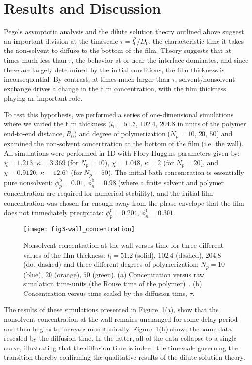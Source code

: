\documentclass[journal=mamobx, layout=twocolumn]{achemso}
\newcommand{\txtf}{\mathrm{f}}
\newcommand{\txtb}{\mathrm{b}}
\begin{document}
\section{Results and Discussion}
Pego's asymptotic analysis and the dilute solution theory outlined above suggest an important division at the timescale $\tau = l_{\txtf}^{2}/D_{0}$, the characteristic time it takes the non-solvent to diffuse to the bottom of the film.
Theory suggests that at times much less than $\tau$, the behavior at or near the interface dominates, and since these are largely determined by the initial conditions, the film thickness is inconsequential.
By contrast, at times much larger than $\tau$, solvent/nonsolvent exchange drives a change in the film concentration, with the film thickness playing an important role.

To test this hypothesis, we performed a series of one-dimensional simulations where we varied the film thickness ($l_{\txtf} = 51.2$, $102.4$, $204.8$ in units of the polymer end-to-end distance, $R_{0}$) and degree of polymerization ($N_{p}=10$, $20$, $50$) and examined the non-solvent concentration at the bottom of the film (i.e. the wall).
All simulations were performed in 1D with Flory-Huggins parameters given by: $\chi = 1.213$, $\kappa = 3.369$ (for $N_{p}=10$), $\chi = 1.048$, $\kappa = 2$ (for $N_{p}=20$), and $\chi = 0.9120$, $\kappa = 12.67$ (for $N_{p}=50$).
The initial bath concentration is essentially pure nonsolvent: $\phi_{p}^{\txtb} = 0.01$, $\phi_{n}^{\txtb} = 0.98$ (where a finite solvent and polymer concentration are required for numerical stability), and the initial film concentration was chosen far enough away from the phase envelope that the film does not immediately precipitate: $\phi_{p}^{\txtf} = 0.204$, $\phi_{n}^{\txtf} = 0.301$.

\begin{figure}[t]
  \texttt{[image: fig3-wall\_concentration]}
    \caption{
Nonsolvent concentration at the wall versus time for three different values of the film thickness: $l_{\txtf} = 51.2$ (solid), $102.4$ (dashed), $204.8$ (dot-dashed) and three different degrees of polymerization: $N_{p} = 10$ (blue), $20$ (orange), $50$ (green).
(a) Concentration versus raw simulation time-units (the Rouse time of the polymer)~\cite{Tree2017}.
(b) Concentration versus time scaled by the diffusion time, $\tau$.
}
  \label{fig-wall_concentration}
\end{figure}

The results of these simulations presented in Figure~\ref{fig-wall_concentration}(a), show that the nonsolvent concentration at the wall remains unchanged for some delay period and then begins to increase monotonically.
Figure~\ref{fig-wall_concentration}(b) shows the same data rescaled by the diffusion time.
In the latter, all of the data collapse to a single curve, illustrating that the diffusion time is indeed the timescale governing the transition thereby confirming the qualitative results of the dilute solution theory.
\end{document}
